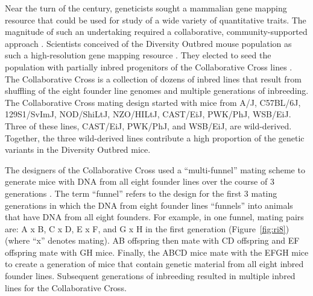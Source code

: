 \documentclass[oneside]{book}\usepackage[]{graphicx}\usepackage[]{color}
\begin{document}
Near the turn of the century, geneticists sought a mammalian gene mapping resource 
that could be used for study of a wide variety of quantitative traits. 
The magnitude of such an undertaking required a collaborative, community-supported
approach \citep{de2014genetics}. Scientists conceived of the Diversity Outbred
mouse population as such a high-resolution gene mapping resource 
\citep{churchill2012diversity,svenson2012high}.
They elected to seed the population with partially inbred progenitors of the
Collaborative Cross lines \citep{churchill2004collaborative}. The Collaborative
Cross is a collection of 
dozens of inbred lines that result from shuffling of the eight founder line
genomes and multiple generations of inbreeding. 
The Collaborative Cross mating design started with
mice from A/J, C57BL/6J, 129S1/SvImJ,
NOD/ShiLtJ, NZO/HILtJ, CAST/EiJ, PWK/PhJ, WSB/EiJ. 
Three of these lines, CAST/EiJ, PWK/PhJ, and WSB/EiJ, are wild-derived. 
Together, the three wild-derived lines contribute a high proportion of 
the genetic variants in the Diversity Outbred mice. 

The designers of the Collaborative Cross used a ``multi-funnel'' mating scheme to generate
mice with DNA from all eight founder lines over the course of 3 generations
\citep{churchill2004collaborative}.
The term ``funnel'' refers to the design for the first 3 mating generations in which the
DNA from eight founder lines ``funnels'' into animals that have DNA from all eight founders.
For example, in one funnel, mating pairs are: A x B, C x D, E x F, and G x H
in the first generation (Figure~\ref{fig:ri8}) (where ``x'' denotes mating).
AB offspring then mate with CD offspring and EF offspring mate with GH mice.
Finally, the ABCD mice mate with the EFGH mice to create a generation of mice that
contain genetic material from all eight inbred founder lines.
Subsequent generations of inbreeding resulted in multiple inbred lines for the Collaborative Cross.
\end{document}
